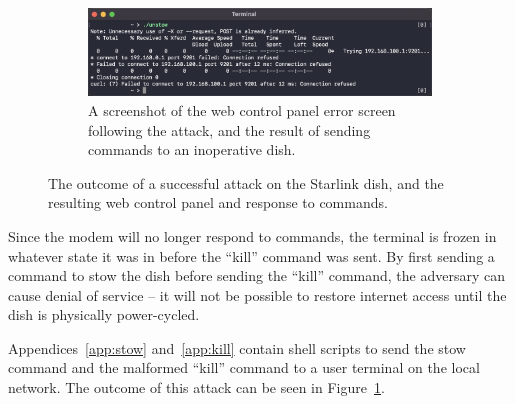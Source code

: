 \begin{figure}
\begin{subfigure}{.5779\textwidth}
        \centering\includegraphics[width=\textwidth]{img/unstow.png}
        \caption{A screenshot of the web control panel error screen following the attack, and the result of sending commands to an inoperative dish.}
    \end{subfigure}
\caption{The outcome of a successful attack on the Starlink dish, and the resulting web control panel and response to commands.}
\label{fig:attack-outcome}
\end{figure}

Since the modem will no longer respond to commands, the terminal is frozen in whatever state it was in before the ``kill'' command was sent.
By first sending a command to stow the dish before sending the ``kill'' command, the adversary can cause denial of service -- it will not be possible to restore internet access until the dish is physically power-cycled.

Appendices~\ref{app:stow} and~\ref{app:kill} contain shell scripts to send the stow command and the malformed ``kill'' command to a user terminal on the local network.
The outcome of this attack can be seen in Figure~\ref{fig:attack-outcome}.
